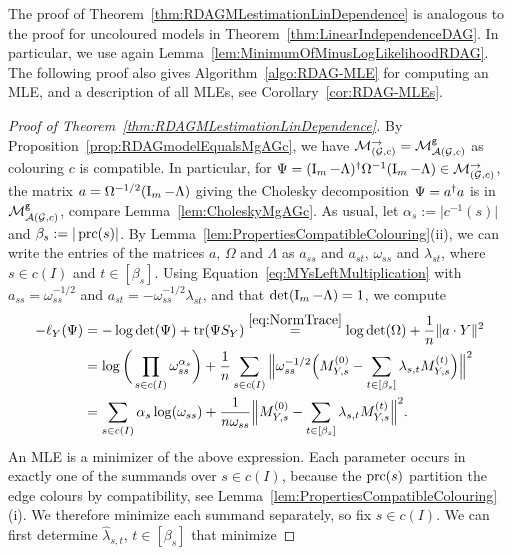 The proof of Theorem~\ref{thm:RDAGMLestimationLinDependence} is analogous to the proof for uncoloured models in Theorem~\ref{thm:LinearIndependenceDAG}. In particular, we use again Lemma~\ref{lem:MinimumOfMinusLogLikelihoodRDAG}. The following proof also gives Algorithm~\ref{algo:RDAG-MLE} for computing an MLE, and a description of all MLEs, see Corollary~\ref{cor:RDAG-MLEs}.

\begin{proof}[Proof of Theorem~\ref{thm:RDAGMLestimationLinDependence}]
	By Proposition~\ref{prop:RDAGmodelEqualsMgAGc}, we have $\mathcal{M}_{(\mathcal{G}, c)}^{\to} = \mathcal{M}^{\mathtt{g}}_{\mathcal{A}(\mathcal{G}, c)}$ as colouring $c$ is compatible. In particular, for $\Psi = (\operatorname{I}_m - \Lambda)^{\dagger} \Omega^{-1} (\operatorname{I}_m - \Lambda) \in \mathcal{M}_{(\mathcal{G}, c)}^{\to}$, the matrix $a = \Omega^{-1/2} (\operatorname{I}_m - \Lambda)$ giving the Cholesky decomposition $\Psi = a^{\dagger} a$ is in $\mathcal{M}^{\mathtt{g}}_{\mathcal{A}(\mathcal{G}, c)}$, compare Lemma~\ref{lem:CholeskyMgAGc}. As usual, let $\alpha_s := \vert c^{-1}(s) \vert$ and $\beta_s := \vert \operatorname{prc}(s) \vert$.
	By Lemma~\ref{lem:PropertiesCompatibleColouring}(ii), we can write the entries of the matrices $a$, $\Omega$ and $\Lambda$ as $a_{ss}$ and $a_{st}$, $\omega_{ss}$ and $\lambda_{st}$, where $s \in c(I)$ and $t \in [\beta_s]$. Using Equation~\eqref{eq:MYsLeftMultiplication} with $a_{ss} = \omega_{ss}^{-1/2}$ and $a_{st} = - \omega_{ss}^{-1/2} \lambda_{st}$, and that $\det(\operatorname{I}_m -\Lambda) = 1$, we compute
	\begin{align*}
			- \ell_Y(\Psi) &= - \log \det(\Psi) + \operatorname{tr}(\Psi S_Y)
			\overset{\eqref{eq:NormTrace}}{=} \log \det(\Omega) + \frac{1}{n} \|a \cdot Y\|^2 \\
			&= \log \bigg(\prod_{s \in c(I)} \omega_{ss}^{\alpha_s} \bigg) + \frac{1}{n} \sum_{s \in c(I)} \Big\| \omega_{ss}^{-1/2} \Big( M_{Y,s}^{(0)} - \sum_{t \in [\beta_s]} \lambda_{s,t} M_{Y,s}^{(t)} \Big) \Big\|^2 \\
			&= \sum_{s \in c(I)} \alpha_s \log(\omega_{ss}) + \frac{1}{n \omega_{ss}} \Big\| M_{Y,s}^{(0)} - \sum_{t \in [\beta_s]} \lambda_{s,t} M_{Y,s}^{(t)} \Big\|^2.
	\end{align*}
	An MLE is a minimizer of the above expression. Each parameter occurs in exactly one of the summands over $s \in c(I)$, because the $\operatorname{prc}(s)$ partition the edge colours by compatibility, see Lemma~\ref{lem:PropertiesCompatibleColouring}(i). We therefore minimize each summand separately, so fix $s \in c(I)$. We can first determine $\hat{\lambda}_{s,t}$, $t \in [\beta_s]$ that minimize

\end{proof}
